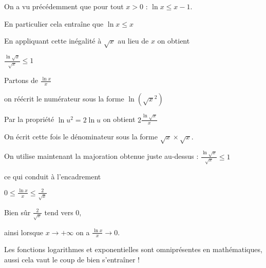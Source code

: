 On a vu précédemment que pour tout $x>0$ : $\ln x \le x-1$. 

En particulier cela entraîne que $\ln x \le x$


\change

En appliquant cette inégalité à $\sqrt x$ au lieu de $x$ on obtient 

$\frac{\ln \sqrt x}{\sqrt x} \le 1$

\change

Partons de $\frac{\ln x}{x}$

on réécrit le numérateur sous la forme $\ln \left(\sqrt{x}^2\right)$

Par la propriété $\ln u^2 = 2\ln u$ on obtient
$2 \frac{\ln \sqrt x}{x} $

On écrit cette fois le dénominateur sous la forme 
$\sqrt x \times \sqrt x$.

On utilise maintenant la majoration obtenue juste au-dessus :
$\frac{\ln \sqrt x}{\sqrt x} \le 1$

ce qui conduit à l'encadrement 

$0 \le \frac{\ln x}{x} \le \frac{2}{\sqrt x}$

\change

Bien sûr $\frac{2}{\sqrt x}$ tend vers $0$,

ainsi lorsque $x\to +\infty$ on a $\frac{\ln x}{x} \to 0$.


\diapo

Les fonctions logarithmes et exponentielles sont omniprésentes
en mathématiques, aussi cela vaut le coup de bien s'entraîner !


